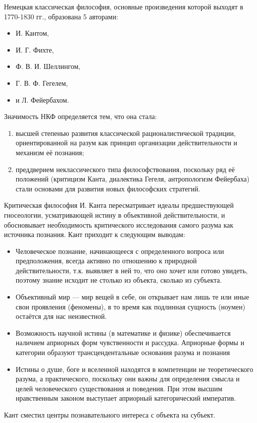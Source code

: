 
Немецкая классическая философия, основные произведения которой выходят в 1770-1830 гг., образована 5 авторами:
\begin{itemize}
    \item И. Кантом,
    \item И. Г. Фихте,
    \item Ф. В. И. Шеллингом,
    \item Г. В. Ф. Гегелем,
    \item и Л. Фейербахом.
\end{itemize}

Значимость НКФ определяется тем, что она стала:
\begin{enumerate}
    \item высшей степенью развития классической рационалистической традиции, ориентированной на разум как принцип организации действительности и механизм её познания;
    \item преддверием неклассического типа философствования, поскольку ряд её положений (критицизм Канта, диалектика Гегеля, антропологизм Фейербаха) стали основами для развития новых философских стратегий.
\end{enumerate}

Критическая философия И. Канта пересматривает идеалы предшествующей гносеологии, усматривающей истину в объективной действительности, и обосновывает необходимость критического исследования самого разума как источника познания. Кант приходит к следующим выводам:
\begin{itemize}
    \item Человеческое познание, начинающееся с определенного вопроса или предположения, всегда активно по отношению к природной действительности, т.к. выявляет в ней то, что оно хочет или готово увидеть, поэтому знание исходит не столько из объекта, сколько из субъекта.
    \item Объективный мир --- мир вещей в себе, он открывает нам лишь те или иные свои проявления (феномены), в то время как подлинная сущность (ноумен) остаётся для нас неизвестной.
    \item Возможность научной истины (в математике и физике) обеспечивается наличием априорных форм чувственности и рассудка. Априорные формы и категории образуют трансцендентальные основания разума и познания
    \item Истины о душе, боге и вселенной находятся в компетенции не теоретического разума, а практического, поскольку они важны для определения смысла и целей человеческого существования и поведения. При этом высшим нравственным законом выступает априорный категорический императив.
\end{itemize}

Кант сместил центры познавательного интереса с объекта на субъект.